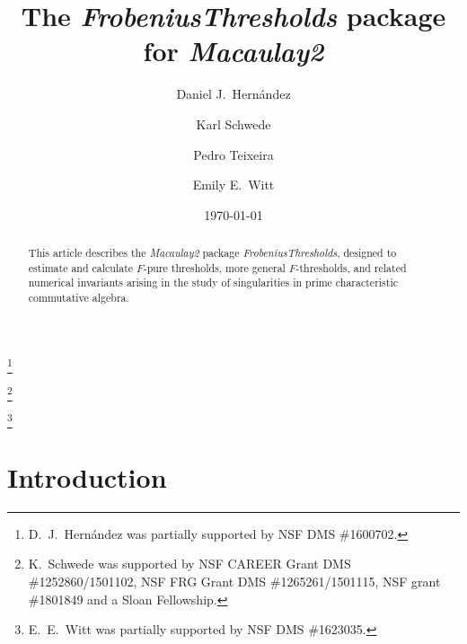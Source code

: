 \documentclass{amsart}
\begin{document}
\title[]{The \emph{FrobeniusThresholds} package for \emph{Macaulay2}}

\author[]{Daniel J.\ Hern\'andez}
\address{Department of Mathematics, University of Kansas, Lawrence, KS~66045, USA}
\thanks{D.~J.~Hern\'andez was partially supported by NSF DMS \#1600702.}



\author[]{Karl Schwede}
\address{Department of Mathematics, University of Utah, Salt Lake City, UT~84112, USA}
\thanks{K.~Schwede was supported by NSF CAREER Grant DMS \#1252860/1501102, NSF FRG Grant DMS \#1265261/1501115, NSF grant \#1801849 and a Sloan Fellowship.}

\author[]{Pedro Teixeira}
\address{Department of Mathematics, Knox College, Galesburg, IL~61401, USA}

\author[]{Emily E.\ Witt}
\address{Department of Mathematics, University of Kansas, Lawrence, KS~66045, USA}
\thanks{E.~E.~Witt was partially supported by NSF DMS \#1623035.}
\date{\today}

\begin{abstract}
   This article describes the \emph{Macaulay2} package \emph{FrobeniusThresholds}, designed to estimate and calculate $F$-pure thresholds, more general $F$-thresholds, and related numerical invariants arising in the study of singularities in prime characteristic commutative algebra.
\end{abstract}



\maketitle

\section{Introduction}
\end{document}
